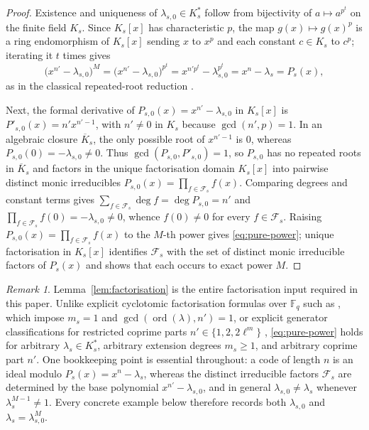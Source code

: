 \documentclass[preprint,12pt]{elsarticle}
\newcommand{\F}{\mathbb F}
\newcommand{\Fs}{\mathcal F_s}
\newcommand{\ord}{\operatorname{ord}}
\numberwithin{equation}{section}
\theoremstyle{plain}
\theoremstyle{definition}
\theoremstyle{remark}
\newtheorem{remark}[theorem]{Remark}
\begin{document}
\begin{proof}
Existence and uniqueness of $\lambda_{s,0}\in K_s^*$ follow from bijectivity of
$a\mapsto a^{p^t}$ on the finite field $K_s$. Since $K_s[x]$ has characteristic
$p$, the map $g(x)\mapsto g(x)^p$ is a ring endomorphism of $K_s[x]$ sending $x$
to $x^p$ and each constant $c\in K_s$ to $c^p$; iterating it $t$ times gives
\[
\bigl(x^{n'}-\lambda_{s,0}\bigr)^M
 =\bigl(x^{n'}-\lambda_{s,0}\bigr)^{p^t}
 =x^{n'p^t}-\lambda_{s,0}^{p^t}
 =x^n-\lambda_s=P_s(x),
\]
as in the classical repeated-root reduction \cite{castagnoli1991,vanLint1991}.

Next, the formal derivative of $P_{s,0}(x)=x^{n'}-\lambda_{s,0}$ in $K_s[x]$ is
$P'_{s,0}(x)=n'x^{n'-1}$, with $n'\neq 0$ in $K_s$ because $\gcd(n',p)=1$. In an
algebraic closure $\overline{K}_s$, the only possible root of $x^{n'-1}$ is $0$,
whereas $P_{s,0}(0)=-\lambda_{s,0}\neq 0$. Thus $\gcd(P_{s,0},P'_{s,0})=1$, so
$P_{s,0}$ has no repeated roots in $\overline{K}_s$ and factors in the unique
factorisation domain $K_s[x]$ into pairwise distinct monic irreducibles
$P_{s,0}(x)=\prod_{f\in\Fs}f(x)$. Comparing degrees and constant terms gives
$\sum_{f\in\Fs}\deg f=\deg P_{s,0}=n'$ and
$\prod_{f\in\Fs}f(0)=-\lambda_{s,0}\neq 0$, whence $f(0)\neq 0$ for every
$f\in\Fs$. Raising $P_{s,0}(x)=\prod_{f\in\Fs}f(x)$ to the $M$-th power gives
\eqref{eq:pure-power}; unique factorisation in $K_s[x]$ identifies $\Fs$ with
the set of distinct monic irreducible factors of $P_s(x)$ and shows that each
occurs to exact power $M$.
\end{proof}

\begin{remark}\label{rem:no-ord-condition}
Lemma~\ref{lem:factorisation} is the entire factorisation input required in this
paper. Unlike explicit cyclotomic factorisation formulas over $\F_q$ such as
\cite[Section~2.4 and Theorem~8]{debnathAffine2026}, which impose $m_s=1$ and
$\gcd(\ord(\lambda),n')=1$, or explicit generator classifications for restricted
coprime parts $n'\in\{1,2,2\ell^m\}$ \cite{dinh2010,dinh2012,chenDinhLiu2015},
\eqref{eq:pure-power} holds for arbitrary $\lambda_s\in K_s^*$, arbitrary
extension degrees $m_s\ge 1$, and arbitrary coprime part $n'$. One bookkeeping
point is essential throughout: a code of length $n$ is an ideal modulo
$P_s(x)=x^n-\lambda_s$, whereas the distinct irreducible factors $\Fs$ are
determined by the base polynomial $x^{n'}-\lambda_{s,0}$, and in general
$\lambda_{s,0}\neq\lambda_s$ whenever $\lambda_s^{M-1}\neq 1$. Every concrete
example below therefore records both $\lambda_{s,0}$ and $\lambda_s=\lambda_{s,0}^M$.
\end{remark}
\end{document}
